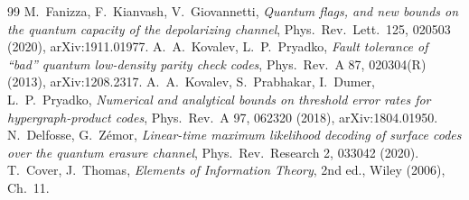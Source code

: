 \begin{thebibliography}{99}
 M.~Fanizza, F.~Kianvash, V.~Giovannetti, \emph{Quantum flags, and new bounds on the quantum capacity of the depolarizing channel}, Phys.\ Rev.\ Lett.\ 125, 020503 (2020), arXiv:1911.01977. %
 A.~A.~Kovalev, L.~P.~Pryadko, \emph{Fault tolerance of ``bad'' quantum low-density parity check codes}, Phys.\ Rev.\ A 87, 020304(R) (2013), arXiv:1208.2317. %
 A.~A.~Kovalev, S.~Prabhakar, I.~Dumer, L.~P.~Pryadko, \emph{Numerical and analytical bounds on threshold error rates for hypergraph-product codes}, Phys.\ Rev.\ A 97, 062320 (2018), arXiv:1804.01950. %
 N.~Delfosse, G.~Z\'emor, \emph{Linear-time maximum likelihood decoding of surface codes over the quantum erasure channel}, Phys.\ Rev.\ Research 2, 033042 (2020). %
 T.~Cover, J.~Thomas, \emph{Elements of Information Theory}, 2nd ed., Wiley (2006), Ch.~11. %
\end{thebibliography}
